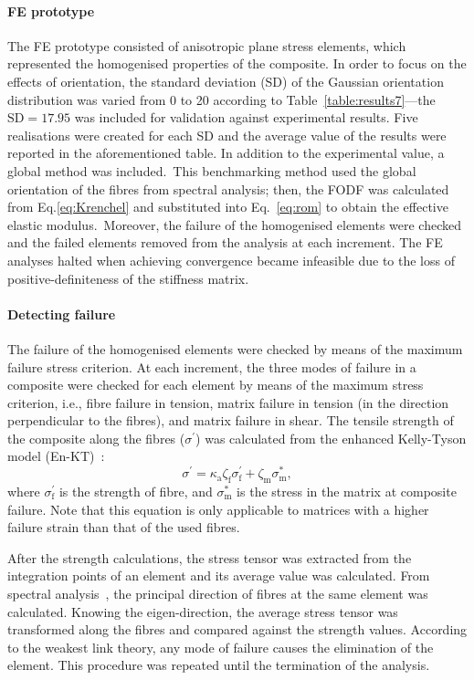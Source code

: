 \paragraph{FE prototype} The FE prototype consisted of anisotropic plane stress elements, which represented the homogenised properties of the composite. In order to focus on the effects of orientation, the standard deviation (SD) of the Gaussian orientation distribution was varied from 0 to 20 according to Table~\ref{table:results7}---the $\text{SD}=17.95$ was included for validation against experimental results. Five realisations were created for each SD and the average value of the results were reported in the aforementioned table. In addition to the experimental value, a global method was included.\red~This benchmarking method used the global orientation of the fibres from spectral analysis; then, the FODF was calculated from Eq.\eqref{eq:Krenchel} and substituted into Eq.~\eqref{eq:rom} to obtain the effective elastic modulus.\bl~Moreover, the failure of the homogenised elements were checked and the failed elements removed from the analysis at each increment. The FE analyses halted when achieving convergence became infeasible due to the loss of positive-definiteness of the stiffness matrix.

\red
	\paragraph{Detecting failure} The failure of the homogenised elements were checked by means of the maximum failure stress criterion. At each increment, the three modes of failure in a composite were checked for each element by means of the maximum stress criterion, i.e., fibre failure in tension, matrix failure in tension (in the direction perpendicular to the fibres), and matrix failure in shear. The tensile strength of the composite along the fibres ($\sigma^\prime$) was calculated from the enhanced Kelly-Tyson model (En-KT)~\autocite{Kelly.1965}:
	\begin{equation}
		\sigma^\prime = \kappa_\text{a} \zeta_\text{f}\sigma^\prime_\text{f}+\zeta_\text{m}\sigma^*_\text{m},\label{eq:en-KT_ch10}
	\end{equation}
	where $\sigma^\prime_\text{f}$ is the strength of fibre, and $\sigma^*_\text{m}$ is the stress in the matrix at composite failure. Note that this equation is only applicable to matrices with a higher failure strain than that of the used fibres.
	
	After the strength calculations, the stress tensor was extracted from the integration points of an element and its average value was calculated. From spectral analysis~\autocite{Javanbakht.2017c,Javanbakht.2019}, the principal direction of fibres at the same element was calculated. Knowing the eigen-direction, the average stress tensor was transformed along the fibres and compared against the strength values. According to the weakest link theory, any mode of failure causes the elimination of the element. This procedure was repeated until the termination of the analysis.
\bl

